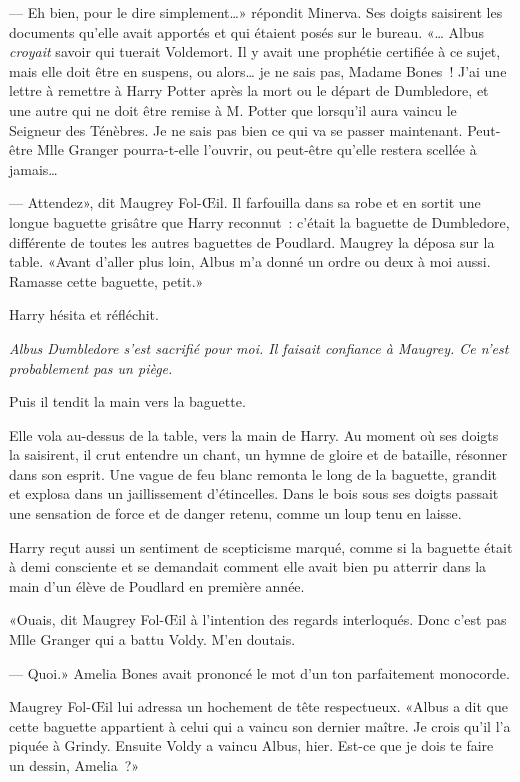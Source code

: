 --- Eh bien, pour le dire simplement…» répondit Minerva. Ses doigts saisirent les documents qu'elle avait apportés et qui étaient posés sur le bureau. «… Albus \emph{croyait} savoir qui tuerait Voldemort. Il y avait une prophétie certifiée à ce sujet, mais elle doit être en suspens, ou alors… je ne sais pas, Madame Bones~! J'ai une lettre à remettre à Harry Potter après la mort ou le départ de Dumbledore, et une autre qui ne doit être remise à M. Potter que lorsqu'il aura vaincu le Seigneur des Ténèbres. Je ne sais pas bien ce qui va se passer maintenant. Peut-être Mlle Granger pourra-t-elle l'ouvrir, ou peut-être qu'elle restera scellée à jamais…

--- Attendez», dit Maugrey Fol-Œil. Il farfouilla dans sa robe et en sortit une longue baguette grisâtre que Harry reconnut~: c'était la baguette de Dumbledore, différente de toutes les autres baguettes de Poudlard. Maugrey la déposa sur la table. «Avant d'aller plus loin, Albus m'a donné un ordre ou deux à moi aussi. Ramasse cette baguette, petit.»

Harry hésita et réfléchit.

\emph{Albus Dumbledore s'est sacrifié pour moi. Il faisait confiance à Maugrey. Ce n'est probablement pas un piège.}

Puis il tendit la main vers la baguette.

Elle vola au-dessus de la table, vers la main de Harry. Au moment où ses doigts la saisirent, il crut entendre un chant, un hymne de gloire et de bataille, résonner dans son esprit. Une vague de feu blanc remonta le long de la baguette, grandit et explosa dans un jaillissement d'étincelles. Dans le bois sous ses doigts passait une sensation de force et de danger retenu, comme un loup tenu en laisse.

Harry reçut aussi un sentiment de scepticisme marqué, comme si la baguette était à demi consciente et se demandait comment elle avait bien pu atterrir dans la main d'un élève de Poudlard en première année.

«Ouais, dit Maugrey Fol-Œil à l'intention des regards interloqués. Donc c'est pas Mlle Granger qui a battu Voldy. M'en doutais.

--- Quoi.» Amelia Bones avait prononcé le mot d'un ton parfaitement monocorde.

Maugrey Fol-Œil lui adressa un hochement de tête respectueux. «Albus a dit que cette baguette appartient à celui qui a vaincu son dernier maître. Je crois qu'il l'a piquée à Grindy. Ensuite Voldy a vaincu Albus, hier. Est-ce que je dois te faire un dessin, Amelia~?»

